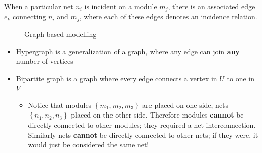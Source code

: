 \documentclass{article}
\begin{document}
When a particular net $n_{i}$ is incident on a module $m_{j}$, there is an associated edge $e_{k}$ connecting $n_{i}$ and $m_{j}$,
where each of these edges denotes an incidence relation.

\begin{figure}[htp]%
    \centering
    \qquad
    \caption{Graph-based modelling}%
\end{figure}

\begin{itemize}
    \item Hypergraph is a generalization of a graph, where any edge can join \textbf{any} number of vertices
    \item Bipartite graph is a graph where every edge connects a vertex in $U$ to one in $V$
        \begin{itemize}
            \item Notice that modules $\left\{ m_{1}, m_{2}, m_{3} \right\}$ are placed on one side,
                  nets $\left\{ n_{1}, n_{2}, n_{3} \right\}$ placed on the other side.
                  Therefore modules \textbf{cannot} be directly connected to other modules; they required a net interconnection.
                  Similarly nets \textbf{cannot} be directly connected to other nets; if they were, it would just be considered the same net!
        \end{itemize}
\end{itemize}
\end{document}
